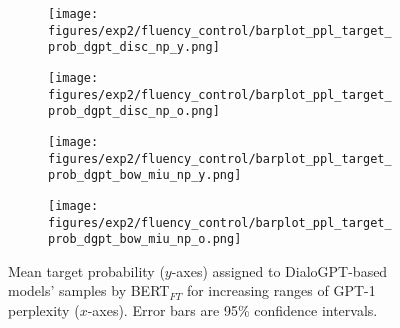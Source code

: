 \begin{figure}[H]
     \centering
     \begin{subfigure}[b]{0.48\textwidth}
        \centering
        \texttt{[image: figures/exp2/fluency\_control/barplot\_ppl\_target\_prob\_dgpt\_disc\_np\_y.png]}
        \caption{}
        \label{subfig:barplot_ppl_target_prob_np_dgpt_disc_young}
     \end{subfigure}
     \quad
     \begin{subfigure}[b]{0.48\textwidth}
        \centering
        \texttt{[image: figures/exp2/fluency\_control/barplot\_ppl\_target\_prob\_dgpt\_disc\_np\_o.png]}
        \caption{}
        \label{subfig:barplot_ppl_target_prob_np_dgpt_disc_old}
     \end{subfigure}
    \medskip
    \begin{subfigure}[b]{0.48\textwidth}
        \centering
        \texttt{[image: figures/exp2/fluency\_control/barplot\_ppl\_target\_prob\_dgpt\_bow\_miu\_np\_y.png]}
        \caption{}
        \label{subfig:barplot_ppl_target_prob_np_dgpt_bow_young}
     \end{subfigure}
    \quad
     \begin{subfigure}[b]{0.48\textwidth}
        \centering
        \texttt{[image: figures/exp2/fluency\_control/barplot\_ppl\_target\_prob\_dgpt\_bow\_miu\_np\_o.png]}
        \caption{}
        \label{subfig:barplot_ppl_target_prob_np_dgpt_bow_old}
     \end{subfigure}
    \caption{Mean target probability ($y$-axes) assigned to DialoGPT-based models' samples by BERT$_{FT}$ for increasing ranges of GPT-1 perplexity ($x$-axes). Error bars are 95\% confidence intervals.}
    \label{fig:barplot_ppl_target_prob_np_dgpt}
\end{figure}

